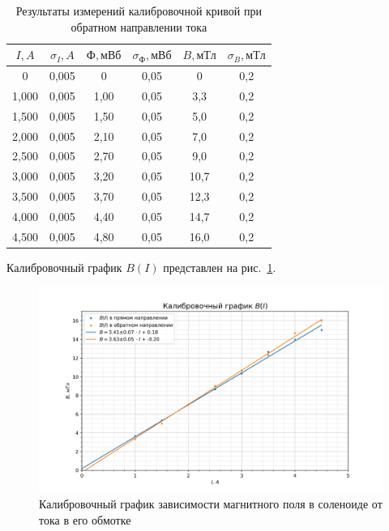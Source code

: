 \documentclass[a4paper, 12pt]{article}
\begin{document}
\begin{table}[h!]
\begin{center}
\begin{tabular}{|c|c|c|c|c|c|}
\hline
$I, A$ & $\sigma_{I}, A$ & $Ф, мВб$ & $\sigma_{Ф}, мВб$ & $B, мТл$ & $\sigma_{B}, мТл$ \\ \hline
0      & 0,005   & 0        & 0,05      & 0        & 0,2       \\ \hline
1,000  & 0,005   & 1,00     & 0,05      & 3,3      & 0,2       \\ \hline
1,500  & 0,005   & 1,50     & 0,05      & 5,0      & 0,2       \\ \hline
2,000  & 0,005   & 2,10     & 0,05      & 7,0      & 0,2       \\ \hline
2,500  & 0,005   & 2,70     & 0,05      & 9,0      & 0,2       \\ \hline
3,000  & 0,005   & 3,20     & 0,05      & 10,7     & 0,2       \\ \hline
3,500  & 0,005   & 3,70     & 0,05      & 12,3     & 0,2       \\ \hline
4,000  & 0,005   & 4,40     & 0,05      & 14,7     & 0,2       \\ \hline
4,500  & 0,005   & 4,80     & 0,05      & 16,0     & 0,2       \\ \hline
\end{tabular}
\end{center}
\caption{Результаты измерений калибровочной кривой при обратном направлении тока}
\label{tab2}
\end{table}

Калибровочный график $B(I)$ представлен на рис.~\ref{ris2}.

\begin{figure}[h!]
\begin{flushleft}
    \includegraphics[scale=0.7]{3.3.1_1.png}
\end{flushleft}
\caption{Калибровочный график зависимости магнитного поля в соленоиде от тока в его обмотке}
\label{ris2}
\end{figure}
\end{document}
